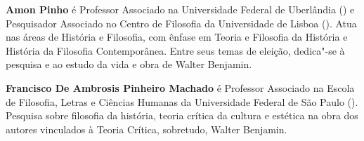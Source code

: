\textbf{Amon Pinho} é Professor Associado na Universidade Federal de Uberlândia () e Pesquisador Associado no Centro de Filosofia da Universidade de Lisboa (). Atua nas
áreas de História e Filosofia, com ênfase em Teoria e Filosofia da História e História da Filosofia
Contemporânea. Entre seus temas de eleição, dedica"-se à pesquisa e ao estudo da vida e obra de
Walter Benjamin.

\textbf{Francisco De Ambrosis Pinheiro Machado} é Professor Associado na Escola de Filosofia, Letras e Ciências Humanas da Universidade Federal de São Paulo (). Pesquisa sobre filosofia da história, teoria crítica da cultura e estética na obra dos autores vinculados à Teoria Crítica, sobretudo, Walter Benjamin. \enlargethispage{\baselineskip}


